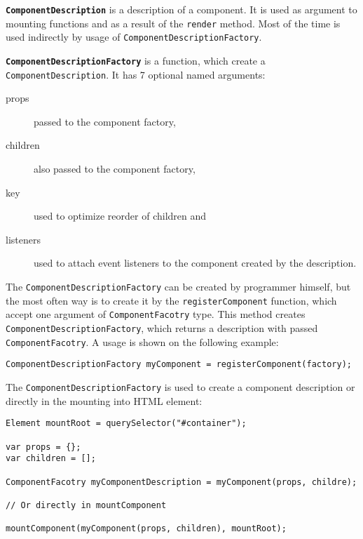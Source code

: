 \documentclass[oneside, 12pt]{book}
\begin{document}


  \textbf{\texttt{ComponentDescription}} is a description of a component. 
  It is used as argument to mounting functions and as a result of the \texttt{render} method.
	Most of the time is used indirectly by usage of \texttt{ComponentDescriptionFactory}.

	\textbf{\texttt{ComponentDescriptionFactory}} is a function, which create a \texttt{ComponentDescription}.
	It has 7 optional named arguments: 
	\begin{description}
		\item[props] passed to the component factory,
		\item[children] also passed to the component factory, 
		\item[key] used to optimize reorder of children and
		\item[listeners] used to attach event listeners to the component created by the description.
	\end{description}

  The \texttt{ComponentDescriptionFactory} can be created by programmer himself, 
	but the most often way is to create it by the \texttt{registerComponent} function, which accept one argument of \texttt{ComponentFacotry} type.
  This method creates \texttt{ComponentDescriptionFactory}, which returns a description with passed \texttt{ComponentFacotry}.
  A usage is shown on the following example:
\begin{verbatim}
ComponentDescriptionFactory myComponent = registerComponent(factory);
\end{verbatim}



  The \texttt{ComponentDescriptionFactory} is used to create a component description or directly in the mounting into HTML element:
\begin{verbatim}
Element mountRoot = querySelector("#container");

var props = {};
var children = [];

ComponentFacotry myComponentDescription = myComponent(props, childre);

// Or directly in mountComponent

mountComponent(myComponent(props, children), mountRoot);
\end{verbatim}
\end{document}
